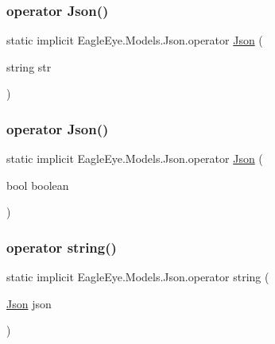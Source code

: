 \mbox{\label{class_eagle_eye_1_1_models_1_1_json_a5c1034bc7b7079844e4a1a22af60e098}} 
\subsubsection{\texorpdfstring{operator Json()}{operator Json()}\hspace{0.1cm}{\footnotesize\ttfamily [3/4]}}
{\footnotesize\ttfamily static implicit Eagle\+Eye.\+Models.\+Json.\+operator \mbox{\hyperlink{class_eagle_eye_1_1_models_1_1_json}{Json}} (\begin{DoxyParamCaption}\item[{string}]{str }\end{DoxyParamCaption})\hspace{0.3cm}{\ttfamily [static]}}

\mbox{\label{class_eagle_eye_1_1_models_1_1_json_aae9601c0e30fb42bab9eebfa7493bf37}} 
\subsubsection{\texorpdfstring{operator Json()}{operator Json()}\hspace{0.1cm}{\footnotesize\ttfamily [4/4]}}
{\footnotesize\ttfamily static implicit Eagle\+Eye.\+Models.\+Json.\+operator \mbox{\hyperlink{class_eagle_eye_1_1_models_1_1_json}{Json}} (\begin{DoxyParamCaption}\item[{bool}]{boolean }\end{DoxyParamCaption})\hspace{0.3cm}{\ttfamily [static]}}

\mbox{\label{class_eagle_eye_1_1_models_1_1_json_adddb99cd1e17f4bd10547a6178f61288}} 
\subsubsection{\texorpdfstring{operator string()}{operator string()}}
{\footnotesize\ttfamily static implicit Eagle\+Eye.\+Models.\+Json.\+operator string (\begin{DoxyParamCaption}\item[{\mbox{\hyperlink{class_eagle_eye_1_1_models_1_1_json}{Json}}}]{json }\end{DoxyParamCaption})\hspace{0.3cm}{\ttfamily [static]}}



